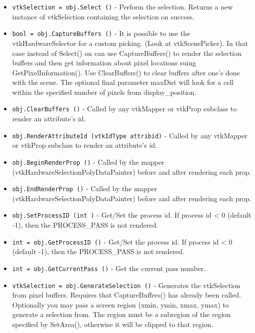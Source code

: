 \begin{itemize}
\item  \verb|vtkSelection = obj.Select ()| -  Perform the selection. Returns  a new instance of vtkSelection containing
 the selection on success.

\item  \verb|bool = obj.CaptureBuffers ()| -  It is possible to use the vtkHardwareSelector for a custom picking. (Look
 at vtkScenePicker). In that case instead of Select() on can use
 CaptureBuffers() to render the selection buffers and then get information
 about pixel locations suing GetPixelInformation(). Use ClearBuffers() to
 clear buffers after one's done with the scene.
 The optional final parameter maxDist will look for a cell within the specified
 number of pixels from display\_position.

\item  \verb|obj.ClearBuffers ()| -  Called by any vtkMapper or vtkProp subclass to render an attribute's id.

\item  \verb|obj.RenderAttributeId (vtkIdType attribid)| -  Called by any vtkMapper or vtkProp subclass to render an attribute's id.

\item  \verb|obj.BeginRenderProp ()| -  Called by the mapper (vtkHardwareSelectionPolyDataPainter) before and after
 rendering each prop.

\item  \verb|obj.EndRenderProp ()| -  Called by the mapper (vtkHardwareSelectionPolyDataPainter) before and after
 rendering each prop.

\item  \verb|obj.SetProcessID (int )| -  Get/Set the process id. If process id < 0 (default -1), then the
 PROCESS\_PASS is not rendered.

\item  \verb|int = obj.GetProcessID ()| -  Get/Set the process id. If process id < 0 (default -1), then the
 PROCESS\_PASS is not rendered.

\item  \verb|int = obj.GetCurrentPass ()| -  Get the current pass number.

\item  \verb|vtkSelection = obj.GenerateSelection ()| -  Generates the vtkSelection from pixel buffers.
 Requires that CaptureBuffers() has already been called.
 Optionally you may pass a screen region (xmin, ymin, xmax, ymax)
 to generate a selection from. The region must be a subregion
 of the region specified by SetArea(), otherwise it will be
 clipped to that region.


\end{itemize}
